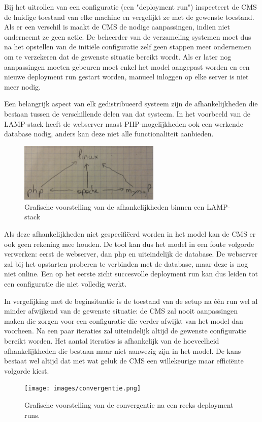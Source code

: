Bij het uitrollen van een configuratie (een "deployment run") inspecteert de CMS de huidige toestand van elke machine en vergelijkt ze met de gewenste toestand.
Als er een verschil is maakt de CMS de nodige aanpassingen, indien niet onderneemt ze geen actie.
De beheerder van de verzameling systemen moet dus na het opstellen van de initi\"ele configuratie zelf geen stappen meer ondernemen om te verzekeren dat de gewenste situatie bereikt wordt.
Als er later nog aanpassingen moeten gebeuren moet enkel het model aangepast worden en een nieuwe deployment run gestart worden, manueel inloggen op elke server is niet meer nodig.


Een belangrijk aspect van elk gedistribueerd systeem zijn de afhankelijkheden die bestaan tussen de verschillende delen van dat systeem.
In het voorbeeld van de LAMP-stack heeft de webserver naast PHP-mogelijkheden ook een werkende database nodig, anders kan deze niet alle functionaliteit aanbieden.
\begin{figure}
    \label{fig:lamp_dep}
    \begin{center}
    \includegraphics[width=0.6\textwidth]{images/lamp_dep.png}
    \caption{Grafische voorstelling van de afhankelijkheden binnen een LAMP-stack}
    \end{center}
\end{figure}
Als deze afhankelijkheden niet gespecifi\"eerd worden in het model kan de CMS er ook geen rekening mee houden.
De tool kan dus het model in een foute volgorde verwerken: eerst de webserver, dan php en uiteindelijk de database.
De webserver zal bij het opstarten proberen te verbinden met de database, maar deze is nog niet online.
Een op het eerste zicht succesvolle deployment run kan dus leiden tot een configuratie die niet volledig werkt.

In vergelijking met de beginsituatie is de toestand van de setup na \'e\'en run wel al minder afwijkend van de gewenste situatie:
de CMS zal nooit aanpassingen maken die zorgen voor een configuratie die verder afwijkt van het model dan voorheen.
Na een paar iteraties zal uiteindelijk altijd de gewenste configuratie bereikt worden.
Het aantal iteraties is afhankelijk van de hoeveelheid afhankelijkheden die bestaan maar niet aanwezig zijn in het model.
De kans bestaat wel altijd dat met wat geluk de CMS een willekeurige maar effici\"ente volgorde kiest.
\begin{figure}
    \label{fig:convergentie}
    \begin{center}
    \texttt{[image: images/convergentie.png]}
    \caption{Grafische voorstelling van de convergentie na een reeks deployment runs.}
    \end{center}
\end{figure}

